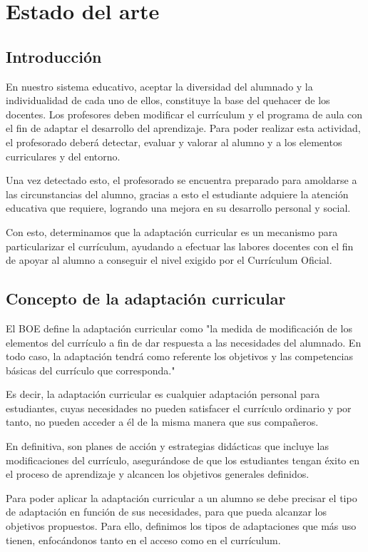 \chapter{Estado del arte}
\label{cap:estadoDelArte}

\section{Introducción}
En nuestro sistema educativo, aceptar la diversidad del alumnado y la individualidad de cada uno de ellos, constituye la base del quehacer de los docentes. Los profesores deben modificar el currículum y el programa de aula con el fin de adaptar el desarrollo del aprendizaje. Para poder realizar esta actividad, el profesorado deberá detectar, evaluar y valorar al alumno y a los elementos curriculares y del entorno.

Una vez detectado esto, el profesorado se encuentra preparado para amoldarse a las circunstancias del alumno, gracias a esto el estudiante adquiere la atención educativa que requiere, logrando una mejora en su desarrollo personal y social.

Con esto, determinamos que la adaptación curricular es un mecanismo para particularizar el currículum, ayudando a efectuar las labores docentes con el fin de apoyar al alumno a conseguir el nivel exigido por el Currículum Oficial.

\section{Concepto de la adaptación curricular}
El BOE define la adaptación curricular como "la medida de modificación de los elementos del currículo a fin de dar respuesta a las necesidades del alumnado. En todo caso, la adaptación tendrá como referente los objetivos y las competencias básicas del currículo que corresponda."

Es decir, la adaptación curricular es cualquier adaptación personal para estudiantes, cuyas necesidades no pueden satisfacer el currículo ordinario y por tanto, no pueden acceder a él de la misma manera que sus compañeros.

En definitiva, son planes de acción y estrategias didácticas que incluye las modificaciones del currículo, asegurándose de que los estudiantes tengan éxito en el proceso de aprendizaje y alcancen los objetivos generales definidos.

Para poder aplicar la adaptación curricular a un alumno se debe precisar el tipo de adaptación en función de sus necesidades, para que pueda alcanzar los objetivos propuestos. Para ello, definimos los tipos de adaptaciones que más uso tienen, enfocándonos tanto en el acceso como en el currículum. 

